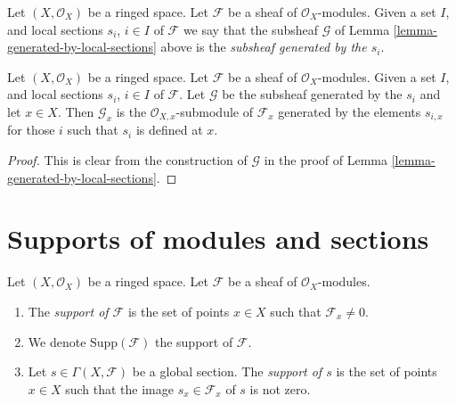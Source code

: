 \begin{definition}
\label{definition-generated-by-local-sections}
Let $(X, \mathcal{O}_X)$ be a ringed space.
Let $\mathcal{F}$ be a sheaf of $\mathcal{O}_X$-modules.
Given a set $I$, and
local sections $s_i$, $i \in I$ of $\mathcal{F}$
we say that the subsheaf $\mathcal{G}$ of
Lemma \ref{lemma-generated-by-local-sections}
above is the {\it subsheaf generated by the $s_i$}.
\end{definition}

\begin{lemma}
\label{lemma-generated-by-local-sections-stalk}
Let $(X, \mathcal{O}_X)$ be a ringed space.
Let $\mathcal{F}$ be a sheaf of $\mathcal{O}_X$-modules.
Given a set $I$, and
local sections $s_i$, $i \in I$ of $\mathcal{F}$.
Let $\mathcal{G}$ be the subsheaf generated by the
$s_i$ and let $x\in X$.
Then $\mathcal{G}_x$ is the $\mathcal{O}_{X, x}$-submodule of
$\mathcal{F}_x$ generated by the elements $s_{i, x}$
for those $i$ such that $s_i$ is defined at $x$.
\end{lemma}

\begin{proof}
This is clear from the construction of $\mathcal{G}$
in the proof of Lemma \ref{lemma-generated-by-local-sections}.
\end{proof}










\section{Supports of modules and sections}
\label{section-support}

\begin{definition}
\label{definition-support}
Let $(X, \mathcal{O}_X)$ be a ringed space.
Let $\mathcal{F}$ be a sheaf of $\mathcal{O}_X$-modules.
\begin{enumerate}
\item The {\it support of $\mathcal{F}$} is the set of
points $x \in X$ such that $\mathcal{F}_x \not = 0$.
\item We denote $\text{Supp}(\mathcal{F})$ the support of $\mathcal{F}$.
\item Let $s \in \Gamma(X, \mathcal{F})$ be a global section.
The {\it support of $s$} is the set of points $x \in X$
such that the image $s_x \in \mathcal{F}_x$ of $s$ is
not zero.
\end{enumerate}
\end{definition}

